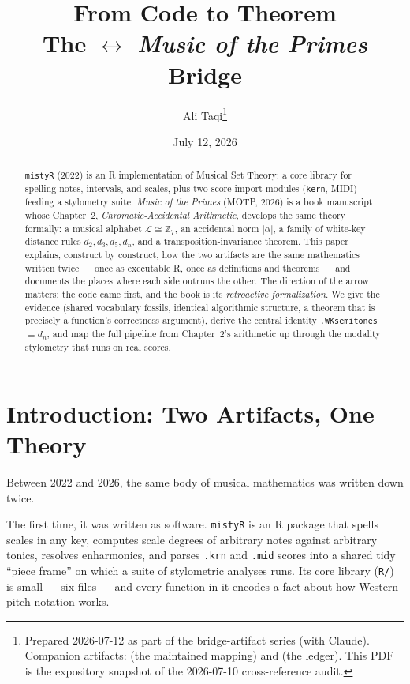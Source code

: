 \documentclass[11pt]{article}
\title{\textbf{From Code to Theorem}\\[4pt]
\Large The \code{mistyR} $\longleftrightarrow$ \emph{Music of the Primes} Bridge}
\author{Ali Taqi\thanks{Prepared 2026-07-12 as part of the bridge-artifact series
(with Claude). Companion artifacts: \file{docs/motp-concordance.md} (the maintained
mapping) and \file{docs/motp-bridge-todo.md} (the ledger). This PDF is the
expository snapshot of the 2026-07-10 cross-reference audit.}}
\date{July 12, 2026}
\newcommand{\MAlph}{\mathcal{L}}                 %
\newcommand{\Zseven}{\mathbb{Z}_7}
\theoremstyle{definition}
\theoremstyle{remark}
\newcommand{\code}[1]{\texttt{#1}}
\newcommand{\file}[1]{\texttt{#1}}
\begin{document}
\maketitle

\begin{abstract}
\noindent
\code{mistyR} (2022) is an R implementation of Musical Set Theory: a core library
for spelling notes, intervals, and scales, plus two score-import modules
(\code{kern}, MIDI) feeding a stylometry suite. \emph{Music of the Primes} (MOTP,
2026) is a book manuscript whose Chapter~2, \emph{Chromatic-Accidental Arithmetic},
develops the same theory formally: a musical alphabet $\MAlph \cong \Zseven$, an
accidental norm $|\alpha|$, a family of white-key distance rules
$d_2, d_3, d_5, d_n$, and a transposition-invariance theorem. This paper explains,
construct by construct, how the two artifacts are the same mathematics written
twice --- once as executable R, once as definitions and theorems --- and documents
the places where each side outruns the other. The direction of the arrow matters:
the code came first, and the book is its \emph{retroactive formalization}. We give
the evidence (shared vocabulary fossils, identical algorithmic structure, a
theorem that is precisely a function's correctness argument), derive the central
identity \code{.WKsemitones} $\equiv d_n$, and map the full pipeline from
Chapter~2's arithmetic up through the modality stylometry that runs on real scores.
\end{abstract}

\tableofcontents
\newpage

\section{Introduction: Two Artifacts, One Theory}

Between 2022 and 2026, the same body of musical mathematics was written down twice.

The first time, it was written as software. \code{mistyR} is an R package that
spells scales in any key, computes scale degrees of arbitrary notes against
arbitrary tonics, resolves enharmonics, and parses \code{.krn} and \code{.mid}
scores into a shared tidy ``piece frame'' on which a suite of stylometric analyses
runs. Its core library (\file{R/}) is small --- six files --- and every function
in it encodes a fact about how Western pitch notation works.
\end{document}
